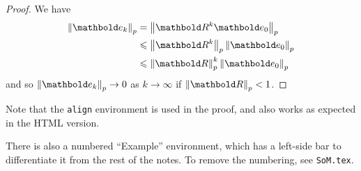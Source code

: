 \begin{proof}
  We have
  \begin{align*}
    \norm{\vect{e}_k}_p &= \norm{\mat{R}^k \vect{e}_0}_p \\
    &\leqslant \norm{\mat{R}^k}_p \norm{\vect{e}_0}_p \\
    &\leqslant \norm{\mat{R}}_p^k \norm{\vect{e}_0}_p 
  \end{align*}
  and so $\norm{\vect{e}_k}_p \to 0$ as $k \to \infty$ if $\norm{\mat{R}}_p < 1$. \qedhere
\end{proof}

Note that the \texttt{align} environment is used in the proof, and also works as expected in the HTML version.

There is also a numbered ``Example'' environment, which has a left-side bar to differentiate it from the rest of the notes. To remove the numbering, see \texttt{SoM.tex}.

